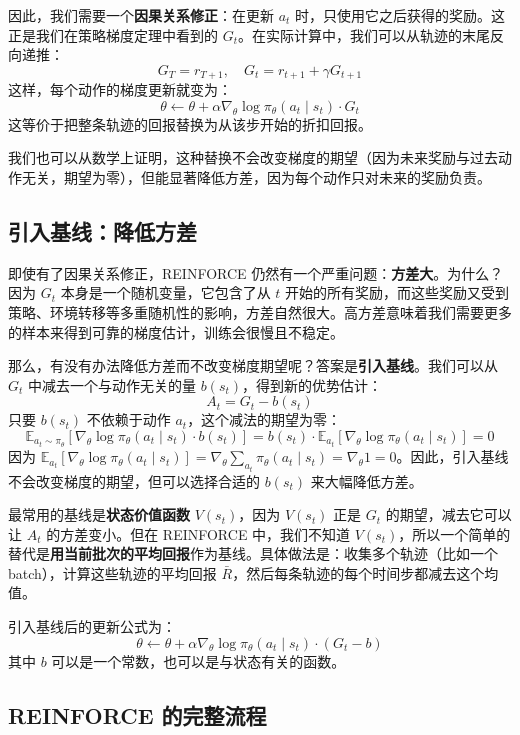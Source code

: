\documentclass[lang=cn,zihao=-4,a4paper,fontset=windows]{beautybook}
\begin{document}
因此，我们需要一个\textbf{因果关系修正}：在更新 \(a_t\) 时，只使用它之后获得的奖励。这正是我们在策略梯度定理中看到的 \(G_t\)。在实际计算中，我们可以从轨迹的末尾反向递推：
\[
G_T = r_{T+1}, \quad G_t = r_{t+1} + \gamma G_{t+1}
\]
这样，每个动作的梯度更新就变为：
\[
\theta \leftarrow \theta + \alpha \nabla_\theta \log \pi_\theta(a_t \mid s_t) \cdot G_t
\]
这等价于把整条轨迹的回报替换为从该步开始的折扣回报。

我们也可以从数学上证明，这种替换不会改变梯度的期望（因为未来奖励与过去动作无关，期望为零），但能显著降低方差，因为每个动作只对未来的奖励负责。

\subsection{引入基线：降低方差}

即使有了因果关系修正，REINFORCE 仍然有一个严重问题：\textbf{方差大}。为什么？因为 \(G_t\) 本身是一个随机变量，它包含了从 \(t\) 开始的所有奖励，而这些奖励又受到策略、环境转移等多重随机性的影响，方差自然很大。高方差意味着我们需要更多的样本来得到可靠的梯度估计，训练会很慢且不稳定。

那么，有没有办法降低方差而不改变梯度期望呢？答案是\textbf{引入基线}。我们可以从 \(G_t\) 中减去一个与动作无关的量 \(b(s_t)\)，得到新的优势估计：
\[
A_t = G_t - b(s_t)
\]
只要 \(b(s_t)\) 不依赖于动作 \(a_t\)，这个减法的期望为零：
\[
\mathbb{E}_{a_t \sim \pi_\theta} [\nabla_\theta \log \pi_\theta(a_t \mid s_t) \cdot b(s_t)] = b(s_t) \cdot \mathbb{E}_{a_t}[\nabla_\theta \log \pi_\theta(a_t \mid s_t)] = 0
\]
因为 \(\mathbb{E}_{a_t}[\nabla_\theta \log \pi_\theta(a_t \mid s_t)] = \nabla_\theta \sum_{a_t} \pi_\theta(a_t \mid s_t) = \nabla_\theta 1 = 0\)。因此，引入基线不会改变梯度的期望，但可以选择合适的 \(b(s_t)\) 来大幅降低方差。

最常用的基线是\textbf{状态价值函数} \(V(s_t)\)，因为 \(V(s_t)\) 正是 \(G_t\) 的期望，减去它可以让 \(A_t\) 的方差变小。但在 REINFORCE 中，我们不知道 \(V(s_t)\)，所以一个简单的替代是\textbf{用当前批次的平均回报}作为基线。具体做法是：收集多个轨迹（比如一个 batch），计算这些轨迹的平均回报 \(\bar{R}\)，然后每条轨迹的每个时间步都减去这个均值。

引入基线后的更新公式为：
\[
\theta \leftarrow \theta + \alpha \nabla_\theta \log \pi_\theta(a_t \mid s_t) \cdot (G_t - b)
\]
其中 \(b\) 可以是一个常数，也可以是与状态有关的函数。

\subsection{REINFORCE 的完整流程}
\end{document}
